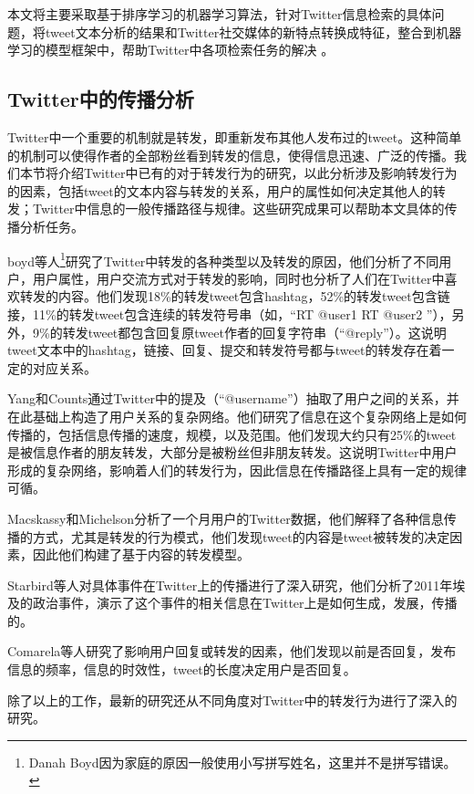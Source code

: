 本文将主要采取基于排序学习的机器学习算法，针对Twitter信息检索的具体问题，将tweet文本分析的结果和Twitter社交媒体的新特点转换成特征，整合到机器学习的模型框架中，帮助Twitter中各项检索任务的解决 。

\subsection{Twitter中的传播分析}
\label{rel3}
Twitter中一个重要的机制就是转发，即重新发布其他人发布过的tweet。这种简单的机制可以使得作者的全部粉丝看到转发的信息，使得信息迅速、广泛的传播。我们本节将介绍Twitter中已有的对于转发行为的研究，以此分析涉及影响转发行为的因素，包括tweet的文本内容与转发的关系，用户的属性如何决定其他人的转发；Twitter中信息的一般传播路径与规律。这些研究成果可以帮助本文具体的传播分析任务。

boyd等人\footnote{Danah Boyd因为家庭的原因一般使用小写拼写姓名，这里并不是拼写错误。}研究了Twitter中转发的各种类型以及转发的原因，他们分析了不同用户，用户属性，用户交流方式对于转发的影响，同时也分析了人们在Twitter中喜欢转发的内容。他们发现18\%的转发tweet包含hashtag，52\%的转发tweet包含链接，11\%的转发tweet包含连续的转发符号串（如，“RT @user1 RT @user2 ”），另外，9\%的转发tweet都包含回复原tweet作者的回复字符串（“@reply”）。这说明tweet文本中的hashtag，链接、回复、提交和转发符号都与tweet的转发存在着一定的对应关系。

Yang和Counts通过Twitter中的提及（“@username”）抽取了用户之间的关系，并在此基础上构造了用户关系的复杂网络。他们研究了信息在这个复杂网络上是如何传播的，包括信息传播的速度，规模，以及范围。他们发现大约只有25\%的tweet是被信息作者的朋友转发，大部分是被粉丝但非朋友转发。这说明Twitter中用户形成的复杂网络，影响着人们的转发行为，因此信息在传播路径上具有一定的规律可循。

Macskassy和Michelson分析了一个月用户的Twitter数据，他们解释了各种信息传播的方式，尤其是转发的行为模式，他们发现tweet的内容是tweet被转发的决定因素，因此他们构建了基于内容的转发模型。

Starbird等人对具体事件在Twitter上的传播进行了深入研究，他们分析了2011年埃及的政治事件，演示了这个事件的相关信息在Twitter上是如何生成，发展，传播的。

Comarela等人研究了影响用户回复或转发的因素，他们发现以前是否回复，发布信息的频率，信息的时效性，tweet的长度决定用户是否回复。

除了以上的工作，最新的研究还从不同角度对Twitter中的转发行为进行了深入的研究。

